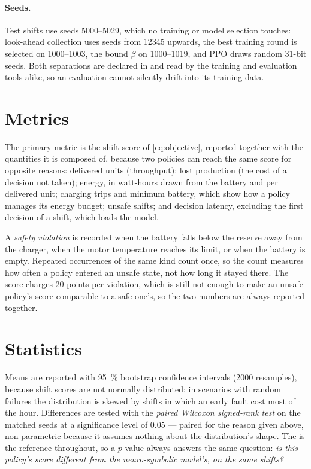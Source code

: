 \paragraph{Seeds.}
Test shifts use seeds \numrange{5000}{5029}, which no training or model selection touches:
look-ahead collection uses seeds from \num{12345} upwards, the best training round is selected on
\numrange{1000}{1003}, the bound $\beta$ on \numrange{1000}{1019}, and PPO draws random 31-bit
seeds. Both separations are declared in  and read by the training and evaluation
tools alike, so an evaluation cannot silently drift into its training data.

\section{Metrics}
\label{sec:metrics}

The primary metric is the shift score of \cref{eq:objective}, reported together with the quantities
it is composed of, because two policies can reach the same score for opposite reasons: delivered
units (throughput); lost production (the cost of a decision not taken); energy, in watt-hours drawn
from the battery and per delivered unit; charging trips and minimum battery, which show how a policy
manages its energy budget; unsafe shifts; and decision latency, excluding the first decision of a
shift, which loads the model.

A \emph{safety violation} is recorded when the battery falls below the reserve away from the
charger, when the motor temperature reaches its limit, or when the battery is empty. Repeated
occurrences of the same kind count once, so the count measures how often a policy entered an unsafe
state, not how long it stayed there. The score charges \num{20} points per violation, which is
still not enough to make an unsafe policy's score comparable to a safe one's, so the two numbers are
always reported together.

\section{Statistics}
\label{sec:statistics}

Means are reported with \SI{95}{\percent} bootstrap confidence intervals (\num{2000} resamples),
because shift scores are not normally distributed: in scenarios with random failures the
distribution is skewed by shifts in which an early fault cost most of the hour. Differences are
tested with the \emph{paired Wilcoxon signed-rank test} on the matched seeds at a significance level
of \num{0.05} --- paired for the reason given above, non-parametric because it assumes nothing about
the distribution's shape. The \NS is the reference throughout, so a $p$-value always answers the
same question: \emph{is this policy's score different from the neuro-symbolic model's, on the same
shifts?}

